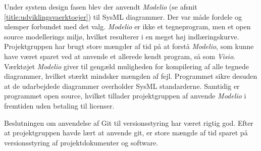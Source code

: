 Under system design fasen blev der anvendt \textit{Modelio} (se afsnit \ref{title:udviklingsvaerktoejer}) til SysML diagrammer. Der var måde fordele og ulemper forbundet med det valg. \textit{Modelio} er ikke et tegneprogram, men et open source modellerings miljø, hvilket resulterer i en meget høj indlæringskurve. Projektgruppen har brugt store mængder af tid på at forstå \textit{Modelio}, som kunne have været sparet ved at anvende et allerede kendt program, så som \textit{Visio}. Værktøjet \textit{Modelio} giver til gengæld muligheden for kompilering af alle tegnede diagrammer, hvilket stærkt mindsker mængden af fejl. Programmet sikre desuden at de udarbejdede diagrammer overholder SysML standarderne. Samtidig er programmet open source, hvilket tillader projektgruppen af anvende \textit{Modelio} i fremtiden uden betaling til licenser.

Beslutningen om anvendelse af Git til versionsstyring har været rigtig god. Efter at projektgruppen havde lært at anvende git, er store mængde af tid sparet på versionsstyring af projektdokumenter og software.

